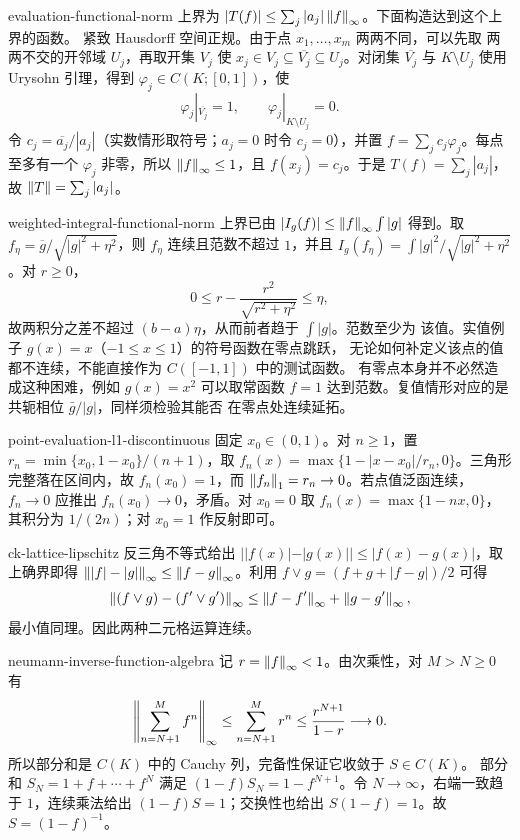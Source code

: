 \begin{solution}{evaluation-functional-norm}
上界为
$|T(f)|\le\sum_j|a_j|\left\lVert f\right\rVert_\infty$。下面构造达到这个上界的函数。
紧致 Hausdorff 空间正规。由于点 $x_1,\ldots,x_m$ 两两不同，可以先取
两两不交的开邻域 $U_j$，再取开集 $V_j$ 使
$x_j\in V_j\subseteq\overline{V_j}\subseteq U_j$。对闭集
$\overline{V_j}$ 与 $K\setminus U_j$ 使用 Urysohn 引理，得到
$\varphi_j\in C(K;[0,1])$，使
\[
 \varphi_j|_{\overline{V_j}}=1,\qquad
 \varphi_j|_{K\setminus U_j}=0.
\]
令 $c_j=\overline{a_j}/|a_j|$（实数情形取符号；$a_j=0$ 时令 $c_j=0$），并置
$f=\sum_jc_j\varphi_j$。每点至多有一个 $\varphi_j$ 非零，所以
$\left\lVert f\right\rVert_\infty\le1$，且
$f(x_j)=c_j$。于是
$T(f)=\sum_j|a_j|$，故
$\left\lVert T\right\rVert=\sum_j|a_j|$。
\end{solution}

\begin{solution}{weighted-integral-functional-norm}
上界已由 $|I_g(f)|\le\left\lVert f\right\rVert_\infty\int|g|$ 得到。取
$f_\eta=\overline g/\sqrt{|g|^2+\eta^2}$，则 $f_\eta$ 连续且范数不超过
$1$，并且
$I_g(f_\eta)=\int |g|^2/\sqrt{|g|^2+\eta^2}$。对 $r\ge0$，
\[
 0\le r-\frac{r^2}{\sqrt{r^2+\eta^2}}\le\eta,
\]
故两积分之差不超过 $(b-a)\eta$，从而前者趋于 $\int|g|$。范数至少为
该值。实值例子 $g(x)=x$（$-1\le x\le1$）的符号函数在零点跳跃，
无论如何补定义该点的值都不连续，不能直接作为 $C([-1,1])$ 中的测试函数。
有零点本身并不必然造成这种困难，例如 $g(x)=x^2$ 可以取常函数 $f=1$
达到范数。复值情形对应的是共轭相位 $\bar g/|g|$，同样须检验其能否
在零点处连续延拓。
\end{solution}

\begin{solution}{point-evaluation-l1-discontinuous}
固定 $x_0\in(0,1)$。对 $n\ge1$，置
$r_n=\min\{x_0,1-x_0\}/(n+1)$，取
$f_n(x)=\max\{1-|x-x_0|/r_n,0\}$。三角形完整落在区间内，故
$f_n(x_0)=1$，而 $\left\lVert f_n\right\rVert_1=r_n\to0$。若点值泛函连续，
$f_n\to0$ 应推出 $f_n(x_0)\to0$，矛盾。对 $x_0=0$ 取
$f_n(x)=\max\{1-nx,0\}$，其积分为 $1/(2n)$；对 $x_0=1$ 作反射即可。
\end{solution}

\begin{solution}{ck-lattice-lipschitz}
反三角不等式给出 $||f(x)|-|g(x)||\le|f(x)-g(x)|$，取上确界即得
$\left\lVert|f|-|g|\right\rVert_\infty\le\left\lVert f-g\right\rVert_\infty$。利用
$f\vee g=(f+g+|f-g|)/2$ 可得
\[
 \left\lVert(f\vee g)-(f'\vee g')\right\rVert_\infty
 \le\left\lVert f-f'\right\rVert_\infty+\left\lVert g-g'\right\rVert_\infty,
\]
最小值同理。因此两种二元格运算连续。
\end{solution}

\begin{solution}{neumann-inverse-function-algebra}
记 $r=\left\lVert f\right\rVert_\infty<1$。由次乘性，对 $M>N\ge0$ 有
\[
 \left\lVert\sum_{n=N+1}^M f^n\right\rVert_\infty
 \le\sum_{n=N+1}^M r^n\le\frac{r^{N+1}}{1-r}\longrightarrow0.
\]
所以部分和是 $C(K)$ 中的 Cauchy 列，完备性保证它收敛于 $S\in C(K)$。
部分和 $S_N=1+f+\cdots+f^N$ 满足
$(1-f)S_N=1-f^{N+1}$。令 $N\to\infty$，右端一致趋于 $1$，连续乘法给出
$(1-f)S=1$；交换性也给出 $S(1-f)=1$。故 $S=(1-f)^{-1}$。
\end{solution}

